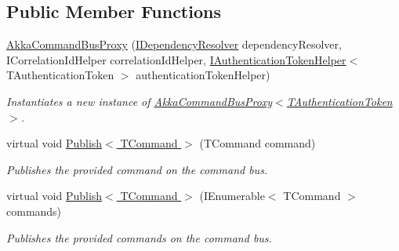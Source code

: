 \subsection*{Public Member Functions}
\begin{DoxyCompactItemize}
\item 
\hyperlink{classCqrs_1_1Akka_1_1Commands_1_1AkkaCommandBusProxy_ad9a3fa7aa546bc2c398d4f52d0659656_ad9a3fa7aa546bc2c398d4f52d0659656}{Akka\+Command\+Bus\+Proxy} (\hyperlink{interfaceCqrs_1_1Configuration_1_1IDependencyResolver}{I\+Dependency\+Resolver} dependency\+Resolver, I\+Correlation\+Id\+Helper correlation\+Id\+Helper, \hyperlink{interfaceCqrs_1_1Authentication_1_1IAuthenticationTokenHelper}{I\+Authentication\+Token\+Helper}$<$ T\+Authentication\+Token $>$ authentication\+Token\+Helper)
\begin{DoxyCompactList}\small\item\em Instantiates a new instance of \hyperlink{classCqrs_1_1Akka_1_1Commands_1_1AkkaCommandBusProxy_ad9a3fa7aa546bc2c398d4f52d0659656_ad9a3fa7aa546bc2c398d4f52d0659656}{Akka\+Command\+Bus\+Proxy$<$\+T\+Authentication\+Token$>$}. \end{DoxyCompactList}\item 
virtual void \hyperlink{classCqrs_1_1Akka_1_1Commands_1_1AkkaCommandBusProxy_a410c0fe52016d04de950b1ae767d2ccb_a410c0fe52016d04de950b1ae767d2ccb}{Publish$<$ T\+Command $>$} (T\+Command command)
\begin{DoxyCompactList}\small\item\em Publishes the provided {\itshape command}  on the command bus. \end{DoxyCompactList}\item 
virtual void \hyperlink{classCqrs_1_1Akka_1_1Commands_1_1AkkaCommandBusProxy_a81dc8162ca933d84b6aee04aff589010_a81dc8162ca933d84b6aee04aff589010}{Publish$<$ T\+Command $>$} (I\+Enumerable$<$ T\+Command $>$ commands)
\begin{DoxyCompactList}\small\item\em Publishes the provided {\itshape commands}  on the command bus. \end{DoxyCompactList}\end{DoxyCompactItemize}
